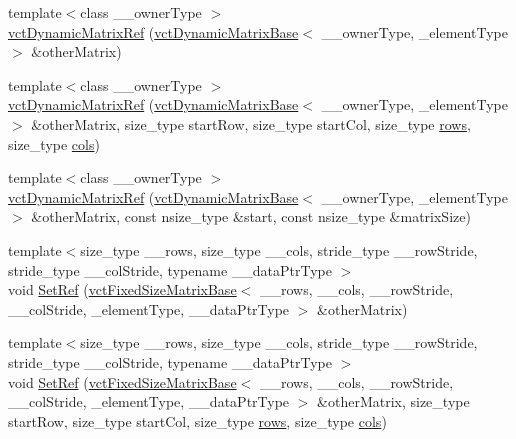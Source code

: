 \begin{DoxyCompactItemize}
\item 
{\footnotesize template$<$class \-\_\-\-\_\-owner\-Type $>$ }\\\hyperlink{classvct_dynamic_matrix_ref_a823a5b7514927ecf3b8cff59566edff0}{vct\-Dynamic\-Matrix\-Ref} (\hyperlink{classvct_dynamic_matrix_base}{vct\-Dynamic\-Matrix\-Base}$<$ \-\_\-\-\_\-owner\-Type, \-\_\-element\-Type $>$ \&other\-Matrix)
\item 
{\footnotesize template$<$class \-\_\-\-\_\-owner\-Type $>$ }\\\hyperlink{classvct_dynamic_matrix_ref_a9fd83d8b3c73759ead58f9344179256e}{vct\-Dynamic\-Matrix\-Ref} (\hyperlink{classvct_dynamic_matrix_base}{vct\-Dynamic\-Matrix\-Base}$<$ \-\_\-\-\_\-owner\-Type, \-\_\-element\-Type $>$ \&other\-Matrix, size\-\_\-type start\-Row, size\-\_\-type start\-Col, size\-\_\-type \hyperlink{classvct_dynamic_const_matrix_base_a5eac13be2207ebeb8766cde379d73438}{rows}, size\-\_\-type \hyperlink{classvct_dynamic_const_matrix_base_aa6c51d41a100da49a7e7ac7edb20ecd9}{cols})
\item 
{\footnotesize template$<$class \-\_\-\-\_\-owner\-Type $>$ }\\\hyperlink{classvct_dynamic_matrix_ref_af36a252093955d288f867e1837b5ffaa}{vct\-Dynamic\-Matrix\-Ref} (\hyperlink{classvct_dynamic_matrix_base}{vct\-Dynamic\-Matrix\-Base}$<$ \-\_\-\-\_\-owner\-Type, \-\_\-element\-Type $>$ \&other\-Matrix, const nsize\-\_\-type \&start, const nsize\-\_\-type \&matrix\-Size)
\item 
{\footnotesize template$<$size\-\_\-type \-\_\-\-\_\-rows, size\-\_\-type \-\_\-\-\_\-cols, stride\-\_\-type \-\_\-\-\_\-row\-Stride, stride\-\_\-type \-\_\-\-\_\-col\-Stride, typename \-\_\-\-\_\-data\-Ptr\-Type $>$ }\\void \hyperlink{classvct_dynamic_matrix_ref_ac002b99788bddb17f831362362d3272c}{Set\-Ref} (\hyperlink{classvct_fixed_size_matrix_base}{vct\-Fixed\-Size\-Matrix\-Base}$<$ \-\_\-\-\_\-rows, \-\_\-\-\_\-cols, \-\_\-\-\_\-row\-Stride, \-\_\-\-\_\-col\-Stride, \-\_\-element\-Type, \-\_\-\-\_\-data\-Ptr\-Type $>$ \&other\-Matrix)
\item 
{\footnotesize template$<$size\-\_\-type \-\_\-\-\_\-rows, size\-\_\-type \-\_\-\-\_\-cols, stride\-\_\-type \-\_\-\-\_\-row\-Stride, stride\-\_\-type \-\_\-\-\_\-col\-Stride, typename \-\_\-\-\_\-data\-Ptr\-Type $>$ }\\void \hyperlink{classvct_dynamic_matrix_ref_ad61bf60c1e01732a4513a7cb8a485a1e}{Set\-Ref} (\hyperlink{classvct_fixed_size_matrix_base}{vct\-Fixed\-Size\-Matrix\-Base}$<$ \-\_\-\-\_\-rows, \-\_\-\-\_\-cols, \-\_\-\-\_\-row\-Stride, \-\_\-\-\_\-col\-Stride, \-\_\-element\-Type, \-\_\-\-\_\-data\-Ptr\-Type $>$ \&other\-Matrix, size\-\_\-type start\-Row, size\-\_\-type start\-Col, size\-\_\-type \hyperlink{classvct_dynamic_const_matrix_base_a5eac13be2207ebeb8766cde379d73438}{rows}, size\-\_\-type \hyperlink{classvct_dynamic_const_matrix_base_aa6c51d41a100da49a7e7ac7edb20ecd9}{cols})

\end{DoxyCompactItemize}
